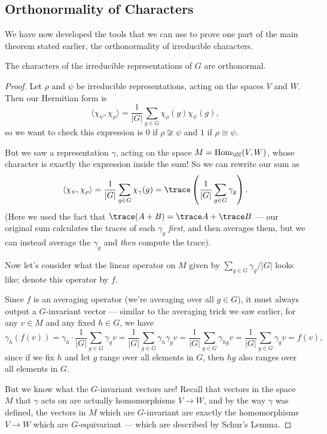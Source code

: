\subsection{Orthonormality of Characters}

We have now developed the tools that we can use to prove one part of the main theorem stated earlier, the orthonormality of irreducible characters. 

\begin{proposition}
    The characters of the irreducible representations of $G$ are orthonormal.
\end{proposition}

\begin{proof}
    Let $\rho$ and $\psi$ be irreducible representations, acting on the spaces $V$ and $W$. Then our Hermitian form is \[\langle \chi_\psi, \chi_\rho \rangle = \frac{1}{|G|} \sum_{g \in G} \overline{\chi_\rho(g)}\chi_\psi(g),\] so we want to check this expression is $0$ if $\rho \not\cong \psi$ and $1$ if $\rho \cong \psi$. 
    
    But we saw a representation $\gamma$, acting on the space $M = \operatorname{Hom}_{\CC}(V, W)$, whose character is exactly the expression inside the sum! So we can rewrite our sum as \[\langle \chi_\psi, \chi_\rho \rangle = \frac{1}{|G|} \sum_{g \in G} \chi_\gamma(g) = \trace \left(\frac{1}{|G|}\sum_{g \in G} \gamma_g\right).\] (Here we used the fact that $\trace(A + B) = \trace A + \trace B$ --- our original sum calculates the traces of each $\gamma_g$ \emph{first}, and then averages them, but we can instead average the $\gamma_g$ and \emph{then} compute the trace).  
    
    Now let's consider what the linear operator on $M$ given by $ \sum_{g \in G} \gamma_g/|G|$ looks like; denote this operator by $f$. 
    
    Since $f$ is an averaging operator (we're averaging over all $g \in G$), it must always output a $G$-invariant vector --- similar to the averaging trick we saw earlier, for any $v \in M$ and any fixed $h \in G$, we have \[\gamma_h(f(v)) = \gamma_h \cdot \frac{1}{|G|} \sum_{g \in G} \gamma_g v = \frac{1}{|G|} \sum_{g \in G} \gamma_h\gamma_g v = \frac{1}{|G|} \sum_{g \in G} \gamma_{hg}v = \frac{1}{|G|} \sum_{g \in G} \gamma_gv = f(v),\] since if we fix $h$ and let $g$ range over all elements in $G$, then $hg$ also ranges over all elements in $G$. 
    
    But we know what the $G$-invariant vectors are! Recall that vectors in the space $M$ that $\gamma$ acts on are actually homomorphisms $V \to W$, and by the way $\gamma$ was defined, the vectors in $M$ which are $G$-invariant are exactly the homomorphisms $V \to W$ which are $G$-equivariant --- which are described by Schur's Lemma. 
    

\end{proof}
